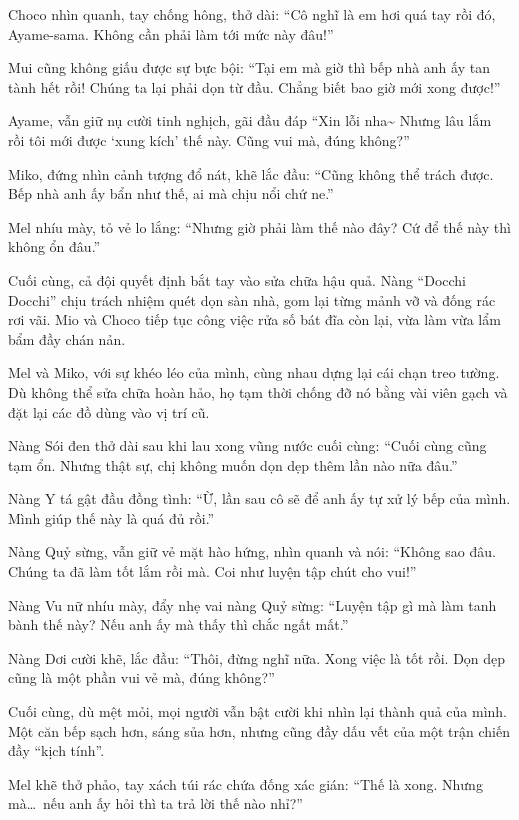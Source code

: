 \documentclass[../main.tex]{subfiles}
\begin{document}
Choco nhìn quanh, tay chống hông, thở dài: ``Cô nghĩ là em hơi quá tay rồi đó, Ayame-sama. Không cần phải làm tới mức này đâu!''

Mui cũng không giấu được sự bực bội: ``Tại em mà giờ thì bếp nhà anh ấy tan tành hết rồi! Chúng ta lại phải dọn từ đầu. Chẳng biết bao giờ mới xong được!''

Ayame, vẫn giữ nụ cười tinh nghịch, gãi đầu đáp ``Xin lỗi nha\~{} Nhưng lâu lắm rồi tôi mới được `xung kích' thế này. Cũng vui mà, đúng không?''

Miko, đứng nhìn cảnh tượng đổ nát, khẽ lắc đầu: ``Cũng không thể trách được. Bếp nhà anh ấy bẩn như thế, ai mà chịu nổi chứ ne.''

Mel nhíu mày, tỏ vẻ lo lắng: ``Nhưng giờ phải làm thế nào đây? Cứ để thế này thì không ổn đâu.''

Cuối cùng, cả đội quyết định bắt tay vào sửa chữa hậu quả. Nàng ``Docchi Docchi'' chịu trách nhiệm quét dọn sàn nhà, gom lại từng mảnh vỡ và đống rác rơi vãi. Mio và Choco tiếp tục công việc rửa số bát đĩa còn lại, vừa làm vừa lẩm bẩm đầy chán nản.

Mel và Miko, với sự khéo léo của mình, cùng nhau dựng lại cái chạn treo tường. Dù không thể sửa chữa hoàn hảo, họ tạm thời chống đỡ nó bằng vài viên gạch và đặt lại các đồ dùng vào vị trí cũ.

Nàng Sói đen thở dài sau khi lau xong vũng nước cuối cùng: ``Cuối cùng cũng tạm ổn. Nhưng thật sự, chị không muốn dọn dẹp thêm lần nào nữa đâu.''

Nàng Y tá gật đầu đồng tình: ``Ừ, lần sau cô sẽ để anh ấy tự xử lý bếp của mình. Mình giúp thế này là quá đủ rồi.''

Nàng Quỷ sừng, vẫn giữ vẻ mặt hào hứng, nhìn quanh và nói: ``Không sao đâu. Chúng ta đã làm tốt lắm rồi mà. Coi như luyện tập chút cho vui!''

Nàng Vu nữ nhíu mày, đẩy nhẹ vai nàng Quỷ sừng: ``Luyện tập gì mà làm tanh bành thế này? Nếu anh ấy mà thấy thì chắc ngất mất.''

Nàng Dơi cười khẽ, lắc đầu: ``Thôi, đừng nghĩ nữa. Xong việc là tốt rồi. Dọn dẹp cũng là một phần vui vẻ mà, đúng không?''

Cuối cùng, dù mệt mỏi, mọi người vẫn bật cười khi nhìn lại thành quả của mình. Một căn bếp sạch hơn, sáng sủa hơn, nhưng cũng đầy dấu vết của một trận chiến đầy ``kịch tính''.

Mel khẽ thở phảo, tay xách túi rác chứa đống xác gián: ``Thế là xong. Nhưng mà\dots\ nếu anh ấy hỏi thì ta trả lời thế nào nhỉ?''
\end{document}
